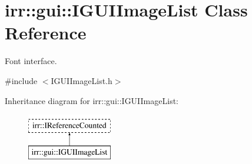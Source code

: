 \hypertarget{classirr_1_1gui_1_1IGUIImageList}{}\section{irr\+:\+:gui\+:\+:I\+G\+U\+I\+Image\+List Class Reference}
\label{classirr_1_1gui_1_1IGUIImageList}


Font interface.  




{\ttfamily \#include $<$I\+G\+U\+I\+Image\+List.\+h$>$}

Inheritance diagram for irr\+:\+:gui\+:\+:I\+G\+U\+I\+Image\+List\+:\begin{figure}[H]
\begin{center}
\leavevmode
\includegraphics[height=2.000000cm]{classirr_1_1gui_1_1IGUIImageList}
\end{center}
\end{figure}
